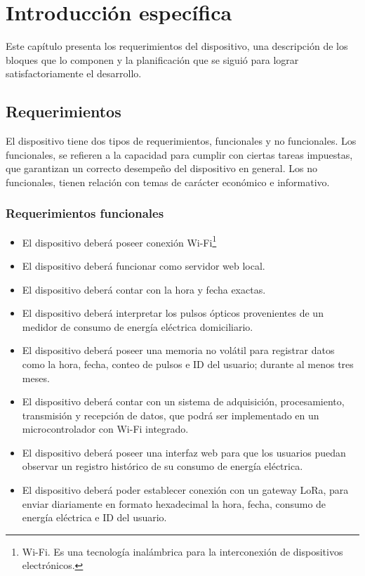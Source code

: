 \chapter{Introducción específica} %

\label{Chapter2}


Este capítulo presenta los requerimientos del dispositivo, una descripción de los bloques que lo componen y la planificación que se siguió para lograr satisfactoriamente el desarrollo.


\section{Requerimientos}

El dispositivo tiene dos tipos de requerimientos, funcionales y no funcionales. Los funcionales, se refieren a la capacidad para cumplir con ciertas tareas impuestas, que garantizan un correcto desempeño del dispositivo en general. Los no funcionales, tienen relación con temas de carácter económico e informativo.

\subsection{Requerimientos funcionales}

\begin{itemize}
	\item El dispositivo deberá poseer conexión Wi-Fi\footnote{Wi-Fi. Es una tecnología inalámbrica para la interconexión de dispositivos electrónicos.}
	\item El dispositivo deberá funcionar como servidor web local.
	\item El dispositivo deberá contar con la hora y fecha exactas.
	\item El dispositivo deberá interpretar los pulsos ópticos provenientes de un medidor de consumo de energía eléctrica domiciliario.
	\item El dispositivo deberá poseer una memoria no volátil para registrar datos como la hora, fecha, conteo de pulsos e ID del usuario; durante al menos tres meses.
	\item El dispositivo deberá contar con un sistema de adquisición, procesamiento, transmisión y recepción de datos, que podrá ser implementado en un microcontrolador con Wi-Fi integrado.
	\item El dispositivo deberá poseer una interfaz web para que los usuarios puedan observar un registro histórico de su consumo de energía eléctrica.
	\item El dispositivo deberá poder establecer conexión con un gateway LoRa, para enviar diariamente en formato hexadecimal la hora, fecha, consumo de energía eléctrica e ID del usuario.
\end{itemize}

